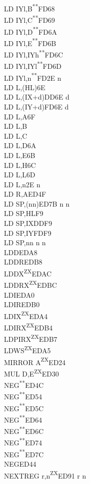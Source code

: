 \documentclass[12pt,twoside,openright,a4paper]{book}
\newcommand{\UNDOC}{\textnormal{\textsuperscript{**}}}
\newcommand{\ZXN}{\textnormal{\textsuperscript{ZX}}}
\begin{document}
\begin{multicols}{3}
{\begin{tabbing}
	LD IYl,B\UNDOC\>FD68\\
	LD IYl,C\UNDOC\>FD69\\
	LD IYl,D\UNDOC\>FD6A\\
	LD IYl,E\UNDOC\>FD6B\\
	LD IYl,IYh\UNDOC\>FD6C\\
	LD IYl,IYl\UNDOC\>FD6D\\
	LD IYl,n\UNDOC\>FD2E n\\
	LD L,(HL)\>6E\\
	LD L,(IX+d)\>DD6E d\\
	LD L,(IY+d)\>FD6E d\\
	LD L,A\>6F\\
	LD L,B\\
	LD L,C\\
	LD L,D\>6A\\
	LD L,E\>6B\\
	LD L,H\>6C\\
	LD L,L\>6D\\
	LD L,n\>2E n\\
	LD R,A\>ED4F\\
	LD SP,(nn)\>ED7B n n\\
	LD SP,HL\>F9\\
	LD SP,IX\>DDF9\\
	LD SP,IY\>FDF9\\
	LD SP,nn n n\\
	LDD\>EDA8\\
	LDDR\>EDB8\\
	LDDX\ZXN\>EDAC\\
	LDDRX\ZXN\>EDBC\\
	LDI\>EDA0\\
	LDIR\>EDB0\\
	LDIX\ZXN\>EDA4\\
	LDIRX\ZXN\>EDB4\\
	LDPIRX\ZXN\>EDB7\\
	LDWS\ZXN\>EDA5\\
	MIRROR A\ZXN\>ED24\\
	MUL D,E\ZXN\>ED30\\
	NEG\UNDOC\>ED4C\\
	NEG\UNDOC\>ED54\\
	NEG\UNDOC\>ED5C\\
	NEG\UNDOC\>ED64\\
	NEG\UNDOC\>ED6C\\
	NEG\UNDOC\>ED74\\
	NEG\UNDOC\>ED7C\\
	NEG\>ED44\\
	NEXTREG r,n\ZXN\>ED91 r n\\

\end{tabbing}}
\end{multicols}
\end{document}
